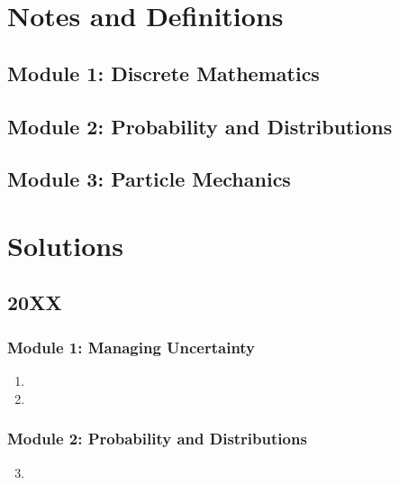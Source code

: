 \documentclass{solutionsmannual}
\begin{document}
\part{Notes and Definitions}
\chapter{Module 1: Discrete Mathematics}

\chapter{Module 2: Probability and Distributions}

\chapter{Module 3: Particle Mechanics}


\part{Solutions}

\chapter{20XX}
\section{Module 1: Managing Uncertainty}
\begin{enumerate}[label=\bfseries  \arabic*.]\setcounter{enumi}{0}
\item 
\item 
\end{enumerate}
\section{Module 2: Probability and Distributions}
\begin{enumerate}[label=\bfseries  \arabic*.]\setcounter{enumi}{2}
\item 
\end{enumerate}
\end{document}
